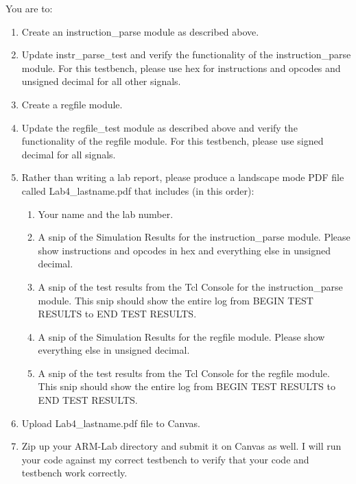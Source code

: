 You are to:
\begin{enumerate}
\item Create an instruction\_parse module as described above.
\item Update instr\_parse\_test and verify the functionality of the instruction\_parse module.  For this testbench, please use hex for instructions and opcodes and unsigned decimal for all other signals.
\item Create a regfile module.
\item Update the regfile\_test module as described above and verify the functionality of the regfile module.  For this testbench, please use signed decimal for all signals.
\item Rather than writing a lab report, please produce a landscape mode PDF file called Lab4\_lastname.pdf that includes (in this order):
\begin{enumerate}
	\item Your name and the lab number.
	\item A snip of the Simulation Results for the instruction\_parse module.  Please show instructions and opcodes in hex and everything else in unsigned decimal.  
	\item A snip of the test results from the Tcl Console for the instruction\_parse module.  This snip should show the entire log from BEGIN TEST RESULTS to END TEST RESULTS.
	\item A snip of the Simulation Results for the regfile module.  Please show everything else in unsigned decimal.  
	\item A snip of the test results from the Tcl Console for the regfile module.  This snip should show the entire log from BEGIN TEST RESULTS to END TEST RESULTS.	
\end{enumerate}
\item Upload Lab4\_lastname.pdf file to Canvas.
\item Zip up your ARM-Lab directory and submit it on Canvas as well.  I will run your code against my correct testbench to verify that your code and testbench work correctly.
\end{enumerate} 